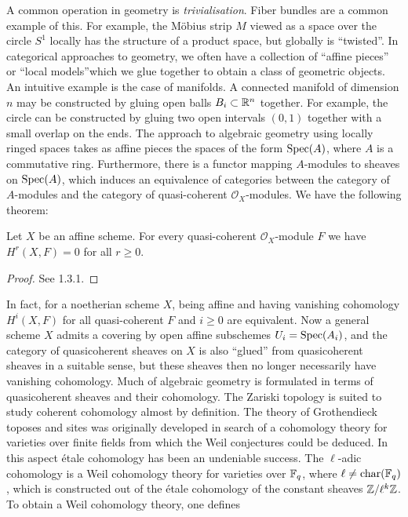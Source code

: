 A common operation in geometry is \textit{trivialisation}. Fiber bundles are a common example of this. For example, the M\"obius strip $M$ viewed as a space over the circle $S^1$ locally has the structure of a product space, but globally is ``twisted''. In categorical approaches to geometry, we often have a collection of ``affine pieces'' or ``local models''which we glue together to obtain a class of geometric objects. An intuitive example is the case of manifolds. A connected manifold of dimension $n$ may be constructed by gluing open balls $B_i \subset \mathbb{R}^n$ together. For example, the circle can be constructed by gluing two open intervals $(0,1)$ together with a small overlap on the ends. The approach to algebraic geometry using locally ringed spaces takes as affine pieces the spaces of the form $\operatorname{Spec}(A)$, where $A$ is a commutative ring. Furthermore, there is a functor mapping $A$-modules to sheaves on $\operatorname{Spec}(A)$, which induces an equivalence of categories between the category of $A$-modules and the category of quasi-coherent $\mathcal{O}_X$-modules. We have the following theorem:

\begin{theorem}
	Let $X$ be an affine scheme. For every quasi-coherent $\mathcal{O}_X$-module $F$ we have $H^r(X,F)=0$ for all $r \ge 0$.
\end{theorem}

\begin{proof}
	See \cite{EGA3} 1.3.1.
\end{proof}

In fact, for a noetherian scheme $X$, being affine and having vanishing cohomology $H^i(X,F)$ for all quasi-coherent $F$ and $i \ge 0$ are equivalent. Now a general scheme $X$ admits a covering by open affine subschemes $U_i = \operatorname{Spec}(A_i)$, and the category of quasicoherent sheaves on $X$ is also ``glued'' from quasicoherent sheaves in a suitable sense, but these sheaves then no longer necessarily have vanishing cohomology. Much of algebraic geometry is formulated in terms of quasicoherent sheaves and their cohomology. The Zariski topology is suited to study coherent cohomology almost by definition. The theory of Grothendieck toposes and sites was originally developed in search of a cohomology theory for varieties over finite fields from which the Weil conjectures could be deduced. In this aspect \'etale cohomology has been an undeniable success. The $\ell$-adic cohomology is a Weil cohomology theory for varieties over $\mathbb{F}_q$, where $\ell \neq \text{char}(\mathbb{F}_q)$, which is constructed out of the \'etale cohomology of the constant sheaves $\mathbb{Z}/\ell^k \mathbb{Z}$. To obtain a Weil cohomology theory, one defines

